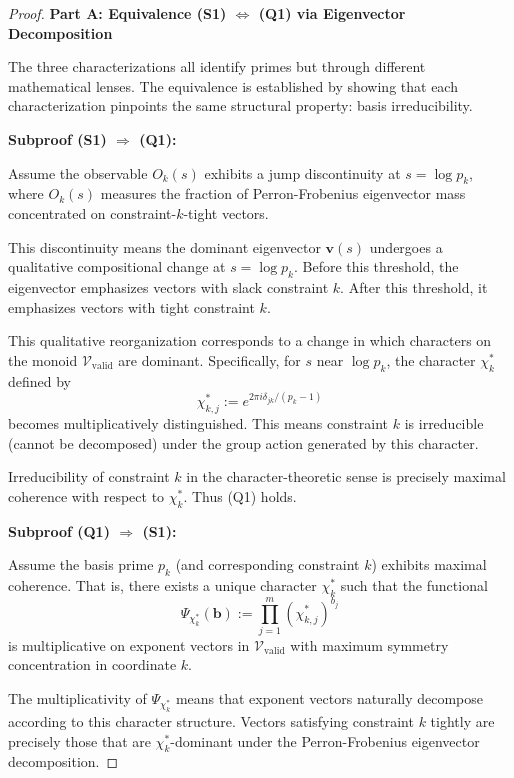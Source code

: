 \begin{proof}

\noindent \textbf{Part A: Equivalence (S1) $\Leftrightarrow$ (Q1) via Eigenvector Decomposition}

The three characterizations all identify primes but through different mathematical lenses. The equivalence is established by showing that each characterization pinpoints the same structural property: basis irreducibility.

\noindent \textbf{Subproof (S1) $\Rightarrow$ (Q1):}

Assume the observable $O_k(s)$ exhibits a jump discontinuity at $s = \log p_k$, where $O_k(s)$ measures the fraction of Perron-Frobenius eigenvector mass concentrated on constraint-$k$-tight vectors.

This discontinuity means the dominant eigenvector $\mathbf{v}(s)$ undergoes a qualitative compositional change at $s = \log p_k$. Before this threshold, the eigenvector emphasizes vectors with slack constraint $k$. After this threshold, it emphasizes vectors with tight constraint $k$.

This qualitative reorganization corresponds to a change in which characters on the monoid $\mathcal{V}_{\text{valid}}$ are dominant. Specifically, for $s$ near $\log p_k$, the character $\chi^*_k$ defined by
\begin{equation}
\chi^*_{k,j} := e^{2\pi i \delta_{jk} / (p_k-1)}
\end{equation}
becomes multiplicatively distinguished. This means constraint $k$ is irreducible (cannot be decomposed) under the group action generated by this character.

Irreducibility of constraint $k$ in the character-theoretic sense is precisely maximal coherence with respect to $\chi^*_k$. Thus (Q1) holds.

\noindent \textbf{Subproof (Q1) $\Rightarrow$ (S1):}

Assume the basis prime $p_k$ (and corresponding constraint $k$) exhibits maximal coherence. That is, there exists a unique character $\chi^*_k$ such that the functional
\begin{equation}
\Psi_{\chi^*_k}(\mathbf{b}) := \prod_{j=1}^m (\chi^*_{k,j})^{b_j}
\end{equation}
is multiplicative on exponent vectors in $\mathcal{V}_{\text{valid}}$ with maximum symmetry concentration in coordinate $k$.

The multiplicativity of $\Psi_{\chi^*_k}$ means that exponent vectors naturally decompose according to this character structure. Vectors satisfying constraint $k$ tightly are precisely those that are $\chi^*_k$-dominant under the Perron-Frobenius eigenvector decomposition.


\end{proof}
